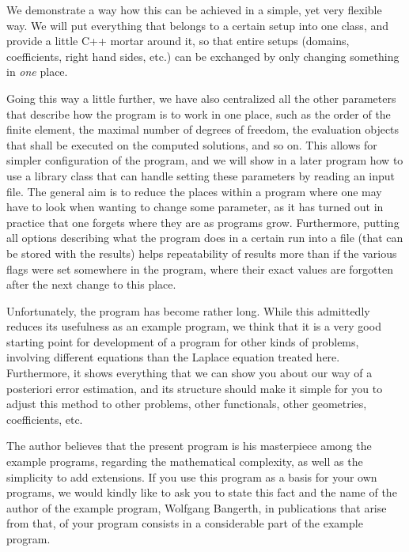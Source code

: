 \documentclass{article}
\begin{document}
We demonstrate a way how this can be achieved in a simple, yet very flexible
way. We will put everything that belongs to a certain setup into one class,
and provide a little C++ mortar around it, so that entire setups (domains,
coefficients, right hand sides, etc.) can be exchanged by only changing
something in \textit{one} place.

Going this way a little further, we have also centralized all the other
parameters that describe how the program is to work in one place, such as the
order of the finite element, the maximal number of degrees of freedom, the
evaluation objects that shall be executed on the computed solutions, and so
on. This allows for simpler configuration of the program, and we will show in
a later program how to use a library class that can handle setting these
parameters by reading an input file. The general aim is to reduce the places
within a program where one may have to look when wanting to change some
parameter, as it has turned out in practice that one forgets where they are as
programs grow. Furthermore, putting all options describing what the program
does in a certain run into a file (that can be stored with the results) helps
repeatability of results more than if the various flags were set somewhere in
the program, where their exact values are forgotten after the next change to
this place.

Unfortunately, the program has become rather long. While this admittedly
reduces its usefulness as an example program, we think that it is a very good
starting point for development of a program for other kinds of problems,
involving different equations than the Laplace equation treated here.
Furthermore, it shows everything that we can show you about our way of a
posteriori error estimation, and its structure should make it simple for you
to adjust this method to other problems, other functionals, other geometries,
coefficients, etc.

The author believes that the present program is his masterpiece among the
example programs, regarding the mathematical complexity, as well as the
simplicity to add extensions. If you use this program as a basis for your own
programs, we would kindly like to ask you to state this fact and the name of
the author of the example program, Wolfgang Bangerth, in publications that
arise from that, of your program consists in a considerable part of the
example program.
\end{document}
